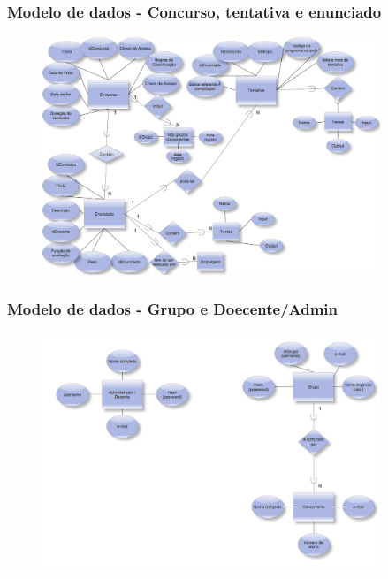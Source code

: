 \documentclass{beamer}
\begin{document}
\begin{frame} \frametitle{Modelo de dados - Concurso, tentativa e enunciado}
\begin{figure}[htbp]
\begin{center}
\includegraphics[width=0.9\textwidth]{../report1/Images/concurso-enunciado}
\end{center}
\end{figure}
\end{frame}


\begin{frame} \frametitle{Modelo de dados - Grupo e Doecente/Admin}
\begin{figure}[htbp]
\begin{center}
\includegraphics[width=0.9\textwidth]{../report1/Images/grupo-docente}
\end{center}
\end{figure}
\end{frame}
\end{document}
